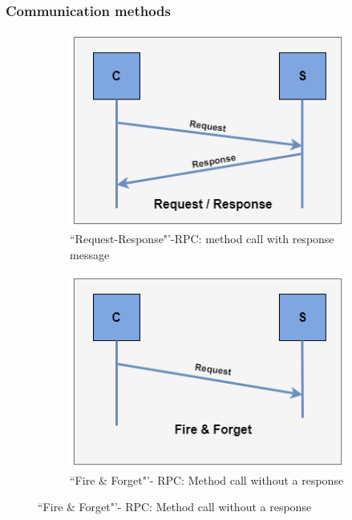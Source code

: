 \subsubsection{Communication methods}
\label{sec:CommunicationMethods}

\begin{figure}[!htb]
		\begin{subfigure}[b]{.5\textwidth}
				\includegraphics[width=\textwidth]{images/Request-response.png}
				\caption{``Request-Response"'-RPC: method call with response message}
				\label{fig:Request-response}
		\end{subfigure}		
		\begin{subfigure}[b]{.5\textwidth}
			\includegraphics[width=\textwidth]{images/fire-forget.png}
			\caption{``Fire \& Forget"'- RPC: Method call without a response}

\end{subfigure}
\end{figure}
